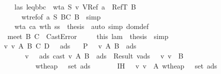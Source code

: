\begin{isabellebody}
\ \ \ \ \ \ \isamarkupfalse \ las{}\ leq{\isacharunderscore}bbc\ \isamarkupfalse \ wta{}{\isacharcolon}\ {\isachardoublequoteopen}{\isacharquery}S{}\ {\isasymturnstile}v\ VRef\ a\ {\isacharcolon}\ RefT\ B{\isachardoublequoteclose}\ \isanewline
\ \ \ \ \ \ \ \ \isamarkupfalse \ wt{\isacharunderscore}ref{\isacharbrackleft}of\ a\ {\isacharquery}S{}\ BC\ B{\isacharbrackright}\ \isamarkupfalse \ simp\ \isamarkupfalse \isanewline
\ \ \ \ \ \ \isamarkupfalse \ wta{}\ ca\ wth{}\ ss{}\ \isamarkupfalse \ {\isacharquery}thesis\ \isamarkupfalse \ {\isacharparenleft}auto\ simp{\isacharcolon}\ dom{\isacharunderscore}def{\isacharparenright}\isanewline
\ \ \ \ \isamarkupfalse \isanewline
\ \ \isamarkupfalse \isanewline
\ \ \ \ \isamarkupfalse \ {\isachardoublequoteopen}meet\ B\ C\ {\isacharequal}\ CastError{\isachardoublequoteclose}\isanewline
\ \ \ \ \isamarkupfalse \ this\ lam\ \isamarkupfalse \ {\isacharquery}thesis\ \isamarkupfalse \ simp\isanewline
\ \ \isamarkupfalse \isanewline
{}\isamarkupfalse \isanewline
\ \ \isamarkupfalse \ \ v{}\ v{}\ A\ B\ C\ D\ {\isasymmu}\ {\isasymSigma}\ ads{}\isanewline
\ \ \isamarkupfalse \ {\isacharquery}P\ {\isacharequal}\ {\isachardoublequoteopen}{\isasymlambda}\ v\ A\ B\ {\isasymmu}\ ads{}\ {\isasymSigma}{\isachardot}\isanewline
\ \ \ \ \ \ \ \ \ {\isacharparenleft}{\isasymexists}\ v{\isacharprime}\ {\isasymSigma}{\isacharprime}\ {\isasymmu}{\isacharprime}\ ads{}{\isachardot}\ cast\ v\ A\ B\ {\isasymmu}\ ads{}\ {\isacharequal}\ Result\ {\isacharparenleft}v{\isacharprime}{\isacharcomma}{\isasymmu}{\isacharprime}{\isacharcomma}ads{}{\isacharparenright}\ {\isasymand}\ {\isasymSigma}{\isacharprime}\ {\isasymturnstile}v\ v{\isacharprime}\ {\isacharcolon}\ B\isanewline
\ \ \ \ \ \ \ \ \ \ \ \ {\isasymand}\ wt{\isacharunderscore}heap\ {\isasymSigma}{\isacharprime}\ {\isasymmu}{\isacharprime}\ {\isacharparenleft}set\ ads{}{\isacharparenright}\ {\isasymand}\ {\isasymSigma}{\isacharprime}\ {\isasymsqsubseteq}\ {\isasymSigma}{\isacharparenright}{\isachardoublequoteclose}\isanewline
\ \ \isamarkupfalse \ IH{}{\isacharcolon}\ {\isachardoublequoteopen}{\isasymAnd}{\isasymSigma}{\isachardot}\ {\isasymlbrakk}{\isasymSigma}\ {\isasymturnstile}v\ v{}\ {\isacharcolon}\ A{\isacharsemicolon}\ wt{\isacharunderscore}heap\ {\isasymSigma}\ {\isasymmu}\ {\isacharparenleft}set\ ads{}{\isacharparenright}{\isasymrbrakk}\ {\isasymLongrightarrow}\isanewline

\end{isabellebody}
